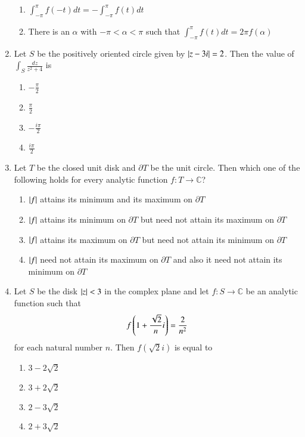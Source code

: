 \documentclass[journal,12pt,onecolumn]{IEEEtran}
\theoremstyle{remark}
\begin{document}
\begin{enumerate}
\begin{enumerate}[label=(\Alph*)]
\item $\int_{-\pi}^\pi f(-t)dt = -\int_{-\pi}^\pi f(t)dt$

\item There is an $\alpha$ with $-\pi < \alpha < \pi$ such that 
$\int_{-\pi}^\pi f(t)dt = 2\pi f(\alpha)$
\end{enumerate}

\item Let $S$ be the positively oriented circle given by $\left\vert z - 3i\right\vert = 2$. 
Then the value of $\int_{S} \frac{dz}{z^2 + 4}$ is
\\[-0.3em]\makebox[\textwidth][r]{\textit{[GATE EE 2025]}}

\begin{enumerate}[label=(\Alph*)]
\item $-\frac{\pi}{2}$
\item $\frac{\pi}{2}$
\item $-\frac{i\pi}{2}$
\item $\frac{i\pi}{2}$
\end{enumerate}

\item Let $T$ be the closed unit disk and $\partial T$ be the unit circle. 
Then which one of the following holds for every analytic function 
$f:T \to \mathbb{C}$?
\\[-0.3em]\makebox[\textwidth][r]{\textit{[GATE EE 2025]}}

\begin{enumerate}[label=(\Alph*)]
\item $\left\vert f\right\vert$ attains its minimum and its maximum on $\partial T$
\item $\left\vert f\right\vert$ attains its minimum on $\partial T$ but need not attain its maximum on $\partial T$
\item $\left\vert f\right\vert$ attains its maximum on $\partial T$ but need not attain its minimum on $\partial T$
\item $\left\vert f\right\vert$ need not attain its maximum on $\partial T$ and also it need not attain its minimum on $\partial T$
\end{enumerate}

\item Let $S$ be the disk $\left\vert z\right\vert < 3$ in the complex plane and let 
$f:S \to \mathbb{C}$ be an analytic function such that 
\[
f\left(1+\frac{\sqrt{2}}{n}i\right) = \frac{2}{n^2}
\]
for each natural number $n$. Then $f(\sqrt{2}i)$ is equal to
\\[-0.3em]\makebox[\textwidth][r]{\textit{[GATE EE 2025]}}

\begin{enumerate}[label=(\Alph*)]
\item $3 - 2\sqrt{2}$
\item $3 + 2\sqrt{2}$
\item $2 - 3\sqrt{2}$
\item $2 + 3\sqrt{2}$
\end{enumerate}


\end{enumerate}
\end{document}
